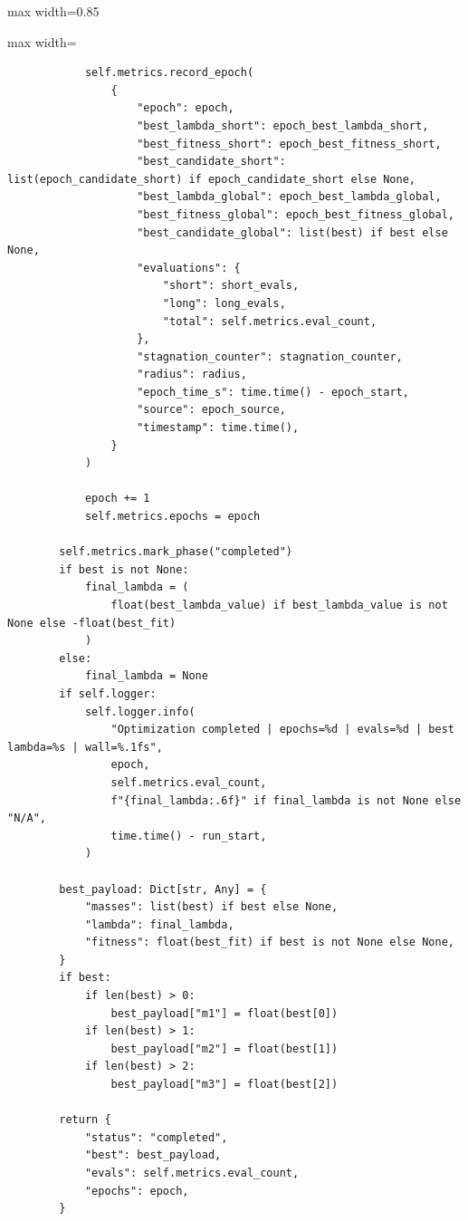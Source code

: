 \begin{listing}[H]
\begin{adjustbox}{max width=0.85\textwidth}
\begin{minipage}{\linewidth}
{\begin{adjustbox}{max width=\textwidth}
\begin{minipage}{\textwidth}
\begin{verbatim}
            self.metrics.record_epoch(
                {
                    "epoch": epoch,
                    "best_lambda_short": epoch_best_lambda_short,
                    "best_fitness_short": epoch_best_fitness_short,
                    "best_candidate_short": list(epoch_candidate_short) if epoch_candidate_short else None,
                    "best_lambda_global": epoch_best_lambda_global,
                    "best_fitness_global": epoch_best_fitness_global,
                    "best_candidate_global": list(best) if best else None,
                    "evaluations": {
                        "short": short_evals,
                        "long": long_evals,
                        "total": self.metrics.eval_count,
                    },
                    "stagnation_counter": stagnation_counter,
                    "radius": radius,
                    "epoch_time_s": time.time() - epoch_start,
                    "source": epoch_source,
                    "timestamp": time.time(),
                }
            )

            epoch += 1
            self.metrics.epochs = epoch

        self.metrics.mark_phase("completed")
        if best is not None:
            final_lambda = (
                float(best_lambda_value) if best_lambda_value is not None else -float(best_fit)
            )
        else:
            final_lambda = None
        if self.logger:
            self.logger.info(
                "Optimization completed | epochs=%d | evals=%d | best lambda=%s | wall=%.1fs",
                epoch,
                self.metrics.eval_count,
                f"{final_lambda:.6f}" if final_lambda is not None else "N/A",
                time.time() - run_start,
            )

        best_payload: Dict[str, Any] = {
            "masses": list(best) if best else None,
            "lambda": final_lambda,
            "fitness": float(best_fit) if best is not None else None,
        }
        if best:
            if len(best) > 0:
                best_payload["m1"] = float(best[0])
            if len(best) > 1:
                best_payload["m2"] = float(best[1])
            if len(best) > 2:
                best_payload["m3"] = float(best[2])

        return {
            "status": "completed",
            "best": best_payload,
            "evals": self.metrics.eval_count,
            "epochs": epoch,
        }
\end{verbatim}
\end{minipage}
\end{adjustbox}


}
\end{minipage}
\end{adjustbox}
\end{listing}

